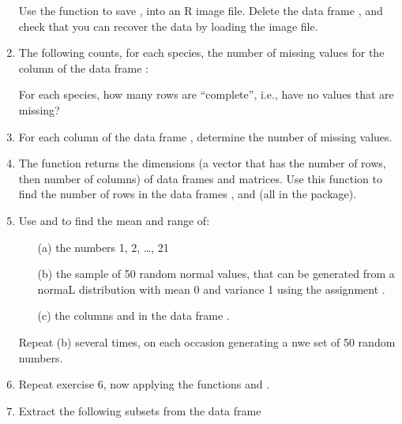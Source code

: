 \begin{enumerate}
  Use the function  to save , into an R
  image file.  Delete the data frame , and check that
  you can recover the data by loading the image file.\label{ex:mol1}
\item The following counts, for each species, the number of missing values
for the column  of the data frame :
\begin{knitrout}
\color{fgcolor}\begin{kframe}
\begin{alltt}
 \hlstd{(}
\end{alltt}
\end{kframe}
\end{knitrout}
For each species, how many rows are ``complete'', i.e., have no values
that are missing?
\item For each column of the data frame ,
determine the number of missing values.
\item The function  returns the dimensions (a vector that
 has the number of rows, then number of columns) of data frames and
 matrices.  Use this function to find the number of rows in the data
 frames ,  and 
 (all in the  package).
\item Use  and  to find the
mean and range of:
\begin{itemize}
  \item[(a)] the numbers 1, 2, \ldots, 21
  \item[(b)] the sample of 50 random normal values, that can be generated
    from a normaL distribution with mean 0 and variance 1 using the
    assignment .
  \item[(c)]
the columns  and  in the
    data frame .
\end{itemize}
Repeat (b) several times, on each occasion generating a nwe set of
50 random numbers.
\item Repeat exercise 6, now applying the functions  and
.
\item Extract the following subsets from the data frame 

\end{enumerate}

